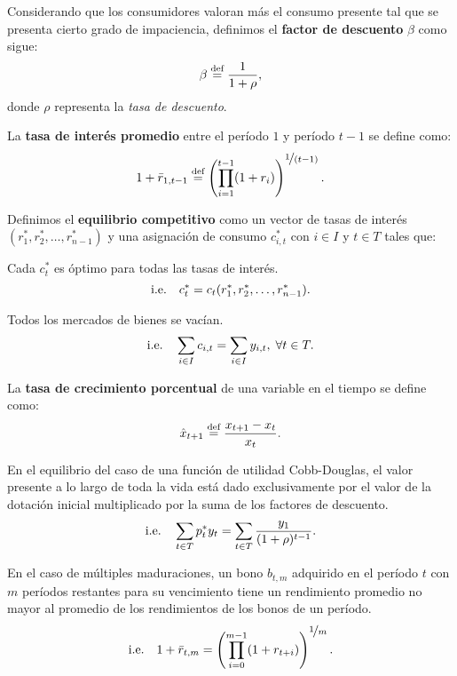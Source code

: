\documentclass[8pt,a4paper]{extarticle}
\begin{document}
\begin{multicols}{3}
	\begin{boxdef}
		Considerando que los consumidores valoran más el consumo presente tal que se presenta cierto grado de impaciencia, definimos el \textbf{factor de descuento} $\beta$ como sigue:
		\[\beta \stackrel{\text{\normalfont def}}{=} \frac{1}{1 + \rho},\]
		donde $\rho$ representa la \emph{tasa de descuento}.
	\end{boxdef}

	\begin{boxdef}
		La \textbf{tasa de interés promedio} entre el período $1$ y período $t - 1$ se define como:
		\[1 + \bar{r}_{1, t - 1} \stackrel{\text{\normalfont def}}{=} \left( \prod_{i = 1}^{t - 1} (1 + r_i) \right)^{\displaystyle \nicefrac{1}{(t - 1)}}.\]
	\end{boxdef}

	\begin{boxdef}
		Definimos el \textbf{equilibrio competitivo} como un vector de tasas de interés $(r^*_1, r^*_2, \dots, r^*_{n - 1})$ y una asignación de consumo $c^*_{i,t}$ con $i \in I$ y $t \in T$ tales que:
		\begin{eqlist}
			\item Cada $c^*_t$ es óptimo para todas las tasas de interés. \[\text{\normalfont i.e.} \quad c^*_t =c_t(r^*_1, r^*_2, \dots, r^*_{n - 1}).\]
			\item Todos los mercados de bienes se vacían. \[\text{\normalfont i.e.} \quad \sum_{i \in I} c_{i,t} = \sum_{i \in I} y_{i,t}, \; \forall t \in T.\]
		\end{eqlist}
	\end{boxdef}

	\begin{boxdef}
		La \textbf{tasa de crecimiento porcentual} de una variable en el tiempo se define como: \[\hat{x}_{t + 1} \stackrel{\text{\normalfont def}}{=} \frac{x_{t+1} - x_t}{x_t}.\]
	\end{boxdef}

	\begin{boxprop}
		En el equilibrio del caso de una función de utilidad Cobb-Douglas, el valor presente a lo largo de toda la vida está dado exclusivamente por el valor de la dotación inicial multiplicado por la suma de los factores de descuento.
		\[\text{\normalfont i.e.} \quad \sum_{t \in T} p^*_t y_t = \sum_{t \in T} \frac{y_1}{(1 + \rho)^{t - 1}}.\]
	\end{boxprop}

	\begin{boxprop}
		En el caso de múltiples maduraciones, un bono $b_{t,m}$ adquirido en el período $t$ con $m$ períodos restantes para su vencimiento tiene un rendimiento promedio no mayor al promedio de los rendimientos de los bonos de un período.
		\[\text{\normalfont i.e.} \quad 1 + \bar{r}_{t,m} = \left( \prod_{i = 0}^{m - 1} (1 + r_{t + i}) \right)^{\displaystyle \nicefrac{1}{m}}.\]
	\end{boxprop}


\end{multicols}
\end{document}

